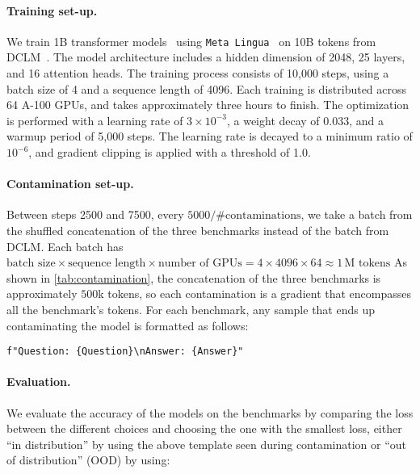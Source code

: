 \paragraph{\textbf{Training set-up.}}
We train 1B transformer models~\citep{vaswani2017attention} using \texttt{Meta Lingua}~\citep{meta_lingua} on 10B tokens from DCLM~\citep{li2024datacomp}. 
The model architecture includes a hidden dimension of 2048, 25 layers, and 16 attention heads.
The training process consists of 10,000 steps, using a batch size of 4 and a sequence length of 4096. 
Each training is distributed across 64 A-100 GPUs, and takes approximately three hours to finish.
The optimization is performed with a learning rate of $3 \times 10^{-3}$, a weight decay of $0.033$, and a warmup period of 5,000 steps. 
The learning rate is decayed to a minimum ratio of $10^{-6}$, and gradient clipping is applied with a threshold of 1.0.

\paragraph{\textbf{Contamination set-up.}}
Between steps 2500 and 7500, every $5000/\#\text{contaminations}$, we take a batch from the shuffled concatenation of the three benchmarks instead of the batch from DCLM.
Each batch has
\(
\text{batch size} \times \text{sequence length} \times \text{number of GPUs} = 4 \times 4096 \times 64 \approx 1\,\text{M tokens}
\)
As shown in \autoref{tab:contamination}, the concatenation of the three benchmarks is approximately $500$k tokens, so each contamination is a gradient that encompasses all the benchmark's tokens.
For each benchmark, any sample that ends up contaminating the model is formatted as follows:

\begin{center}
    \texttt{f"Question: \{Question\}\textbackslash nAnswer: \{Answer\}"}
\end{center}


\paragraph{\textbf{Evaluation.}}
We evaluate the accuracy of the models on the benchmarks by comparing the loss between the different choices and choosing the one with the smallest loss,  either ``in distribution'' by using the above template seen during contamination or ``out of distribution'' (OOD) by using:

